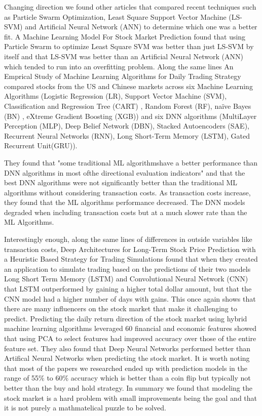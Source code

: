 \documentclass[conference]{IEEEtran}
\begin{document}
Changing direction we found other articles that compared recent techniques such as Particle Swarm Optimization, Least Square Support Vector Machine (LS-SVM) and Artificial Neural Network (ANN) to determine which one was a better fit.  A Machine Learning Model For Stock Market Prediction \cite{MLModelPrediction} found that using Particle Swarm to optimize Least Square SVM was better than just LS-SVM by itself and that LS-SVM was better than an Artificial Neural Network (ANN) which tended to run into an overfitting problem. Along the same lines An Emprical Study of Machine Learning Algorithms for Daily Trading Strategy \cite{EmpiricalStudy} compared stocks from the US and Chinese markets across six Machine Learning Algorithms (Logistic Regression (LR), Support Vector Machine (SVM), Classification and Regression Tree (CART) , Random Forest (RF), naïve Bayes (BN) , eXtreme Gradient Boosting (XGB)) and six DNN algorithms (MultiLayer Perception (MLP), Deep Belief Network (DBN), Stacked Autoencoders (SAE), Recurrent Neural Networks (RNN), Long Short-Term Memory (LSTM), Gated Recurrent Unit(GRU)). 

They found that "some traditional ML algorithmshave a better performance than DNN algorithms in most ofthe directional evaluation indicators" and that the best DNN algorithms were not significantly better than the traditional ML algorithms without considering transaction costs.  As transaction costs increase, they found that the ML algorithms performance decreased.  The DNN models degraded when including transaction costs but at a much slower rate than the ML Algorithms.

Interestingly enough, along the same lines of differences in outside variables like transaction costs, Deep Architectures for Long-Term Stock Price Prediction with a Heuristic Based Strategy for Trading Simulations \cite{LongTermPricePrediction} found that when they created an application to simulate trading based on the predictions of their two models Long Short Term Memory (LSTM) and Convolutional Neural Network (CNN) that LSTM outperformed by gaining a higher total dollar amount, but that the CNN model had a higher number of days with gains.  This once again shows that there are many influencers on the stock market that make it challenging to predict.
Predicting the daily return direction of the stock market using hybrid machine learning algorithms \cite {DailyReturnDirection} leveraged 60 financial and economic features showed that using PCA to select features had improved accuracy over those of the entire feature set.  They also found that Deep Neural Networks performed better than Artifical Neural Networks when predicting the stock market.  It is worth noting that most of the papers we researched ended up with prediction models in the range of 55\% to 60\% accuracy which is better than a coin flip but typically not better than the buy and hold strategy.  In summary we found that modeling the stock market is a hard problem with small improvements being the goal and that it is not purely a mathmatelical puzzle to be solved.
\end{document}
